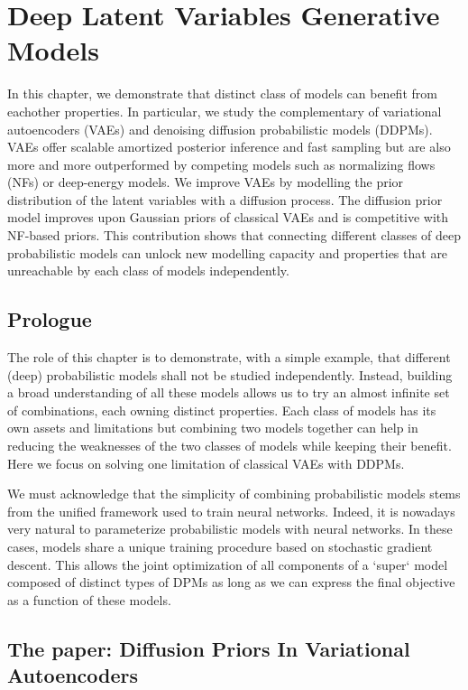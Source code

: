 \chapter{Deep Latent Variables Generative Models}\label{ch:03}

\begin{chapter_outline}
  
  In this chapter, we demonstrate that distinct class of models can benefit from eachother properties. In particular, we study the complementary of variational autoencoders (VAEs) and denoising diffusion probabilistic models (DDPMs). VAEs offer scalable amortized posterior inference and fast sampling but are also more and more outperformed by competing models such as normalizing flows (NFs) or deep-energy models. We improve VAEs by modelling the prior distribution of the latent variables with a diffusion process. The diffusion prior model improves upon Gaussian priors of classical VAEs and is competitive with NF-based priors.
  This contribution shows that connecting different classes of deep probabilistic models can unlock new modelling capacity and properties that are unreachable by each class of models independently.
\end{chapter_outline}
\section{Prologue}
The role of this chapter is to demonstrate, with a simple example, that different (deep) probabilistic models shall not be studied independently. Instead, building a broad understanding of all these models allows us to try an almost infinite set of combinations, each owning distinct properties. Each class of models has its own assets and limitations but combining two models together can help in reducing the weaknesses of the two classes of models while keeping their benefit. Here we focus on solving one limitation of classical VAEs with DDPMs.

We must acknowledge that the simplicity of combining probabilistic models stems from the unified framework used to train neural networks. Indeed, it is nowadays very natural to parameterize probabilistic models with neural networks. In these cases, models share a unique training procedure based on stochastic gradient descent. This allows the joint optimization of all components of a `super` model composed of distinct types of DPMs as long as we can express the final objective as a function of these models.

\section{The paper: Diffusion Priors In Variational Autoencoders}

